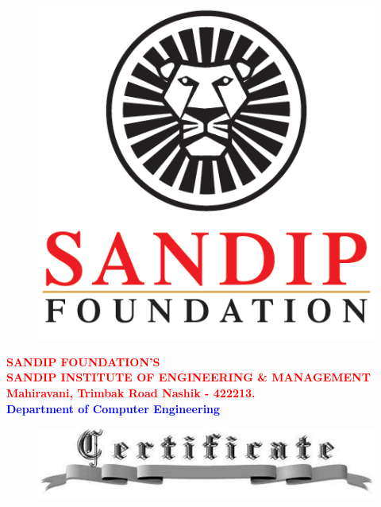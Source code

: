 \newpage
\begin{titlepage}
\begin{center}
\begin{figure}[tbph]
	\centering
	\includegraphics[width=0.2\linewidth]{./nlogo}
\end{figure}
\end{center}
\vspace{-1.3cm}
\begin{center}
	\textcolor{Red}{\large \bf SANDIP FOUNDATION'S}\\
	\textcolor{Red}{\small \bf SANDIP INSTITUTE OF ENGINEERING \& MANAGEMENT}\\
	\textcolor{Red}{\small \bf Mahiravani, Trimbak Road Nashik - 422213.} \\
	
	\textcolor{blue}{ \small \bf Department of Computer  Engineering}	
\end{center}

\begin{center}
\begin{figure}[tbph]
	\centering
	\includegraphics[width=0.7\linewidth]{./certi}
\end{figure}
\end{center}


\end{titlepage}
